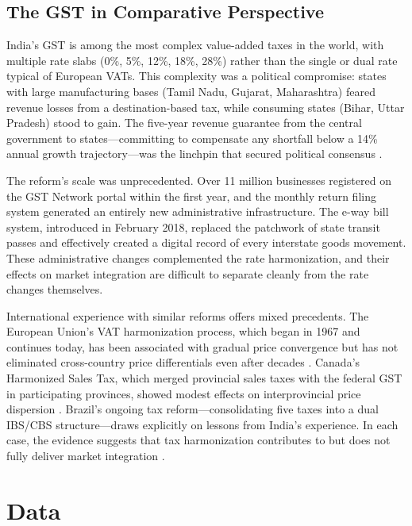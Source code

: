 \documentclass[12pt]{article}
\begin{document}
\subsection{The GST in Comparative Perspective}

India's GST is among the most complex value-added taxes in the world, with multiple rate slabs (0\%, 5\%, 12\%, 18\%, 28\%) rather than the single or dual rate typical of European VATs. This complexity was a political compromise: states with large manufacturing bases (Tamil Nadu, Gujarat, Maharashtra) feared revenue losses from a destination-based tax, while consuming states (Bihar, Uttar Pradesh) stood to gain. The five-year revenue guarantee from the central government to states---committing to compensate any shortfall below a 14\% annual growth trajectory---was the linchpin that secured political consensus \citep{rao2009goods}.

The reform's scale was unprecedented. Over 11 million businesses registered on the GST Network portal within the first year, and the monthly return filing system generated an entirely new administrative infrastructure. The e-way bill system, introduced in February 2018, replaced the patchwork of state transit passes and effectively created a digital record of every interstate goods movement. These administrative changes complemented the rate harmonization, and their effects on market integration are difficult to separate cleanly from the rate changes themselves.

International experience with similar reforms offers mixed precedents. The European Union's VAT harmonization process, which began in 1967 and continues today, has been associated with gradual price convergence but has not eliminated cross-country price differentials even after decades \citep{deboer2012tax}. Canada's Harmonized Sales Tax, which merged provincial sales taxes with the federal GST in participating provinces, showed modest effects on interprovincial price dispersion \citep{keen2013value}. Brazil's ongoing tax reform---consolidating five taxes into a dual IBS/CBS structure---draws explicitly on lessons from India's experience. In each case, the evidence suggests that tax harmonization contributes to but does not fully deliver market integration \citep{cnossen2015mobilizing}.


\section{Data}\label{sec:data}
\end{document}
